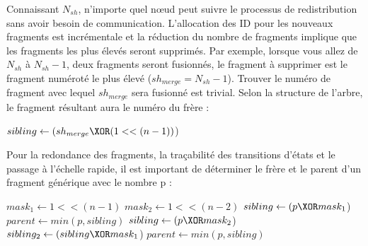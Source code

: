\documentclass[journal]{IEEEtran}
\begin{document}
Connaissant ${N}_{sh}$, n'importe quel nœud peut suivre le processus de redistribution sans avoir besoin de communication. L'allocation des ID pour les nouveaux fragments est incrémentale et la réduction du nombre de fragments implique que les fragments les plus élevés seront supprimés. Par exemple, lorsque vous allez de ${N}_{sh}$ à ${N}_{sh}-1$, deux fragments seront fusionnés, le fragment à supprimer est le fragment numéroté le plus élevé (${sh}_{merge}={N}_{sh}-1$). Trouver le numéro de fragment avec lequel ${sh}_{merge}$ sera fusionné est trivial. Selon la structure de l'arbre, le fragment résultant aura le numéro du frère :

   \begin{algorithm}
    \begin{algorithmic}[1]
            \State $sibling \gets (sh_{merge} \XOR (1<<(n-1))$)
            \State{}

        \EndFunction
    \end{algorithmic}
    \end{algorithm}
    
Pour la redondance des fragments, la traçabilité des transitions d'états et le passage à l'échelle rapide, il est important de déterminer le frère et le parent d'un fragment générique avec le nombre p :
 

    \begin{algorithm}
        \begin{algorithmic}[1]
            \State $mask_{1} \gets 1<<(n-1)$
            \State $mask_{2} \gets 1<<(n-2)$
            \State $sibling \gets (p \XOR mask_{1}$)
            \State $parent \gets min(p, sibling)$
                \State $sibling \gets (p \XOR mask_{2}$)
                \State $sibling_2 \gets (sibling \XOR mask_{1}$)
                \State $parent \gets min(p, sibling)$
                    \State{}
                \Else
                    \State{}
                    \State{}
                    \State{}
                \EndIf
            \Else{}
                \State{}
            \EndIf

            \EndFunction
        \end{algorithmic}
    \end{algorithm}
\end{document}
